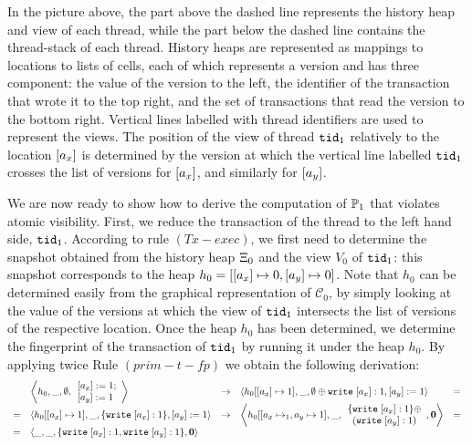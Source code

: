 \documentclass[a4paper,UKenglish]{article}%
\theoremstyle{plain}
\begin{document}
In the picture above, the part above the dashed line represents the history heap and 
view of each thread, while the part below the dashed line contains the thread-stack 
of each thread. History heaps are represented as mappings to locations to lists of cells, 
each of which represents a version and has three component: the value of the version 
to the left, the identifier of the transaction that wrote it to the top right, and the 
set of transactions that read the version to the bottom right. Vertical lines labelled 
with thread identifiers are used to represent the views. The position of the view of 
thread $\mathtt{tid}_1$ relatively to the location $[a_x]$ is determined by the version 
at which the vertical line labelled $\mathtt{tid}_1$ crosses the list of versions for $[a_x]$,
 and similarly for $[a_y]$.

We are now ready to show how to derive the computation of $\mathbb{P}_1$ that 
violates atomic visibility. First, we reduce the transaction of the thread 
to the left hand side, $\mathtt{tid}_1$. According to rule $(Tx-exec)$, we first need 
to determine the snapshot obtained from the history heap $\Xi_{0}$ and the 
view $V_0$ of $\mathtt{tid}_1$: this snapshot corresponds to the heap $h_0 = [ [a_x] \mapsto 0, 
[a_y] \mapsto 0]$. Note that $h_0$ can be determined easily from the graphical 
representation of $\mathcal{C}_0$, by simply looking at the value of the versions at 
which the view of $\mathtt{tid}_1$ intersects the list of versions of the respective location.
Once the heap $h_0$ has been determined, we determine the fingerprint of the 
transaction of $\mathtt{tid}_1$ by running it under the heap $h_0$. By applying twice Rule 
$(prim-t-fp)$ we obtain the following derivation: 
\begin{equation}
\label{eq:tx1}
\begin{array}{llcll}
&\left\langle h_0, \_, \emptyset, \begin{array}{l}
\pmutate{\loc_x}{1};\\ \pmutate{\loc_y}{1} \end{array} \right\rangle 
&\rightarrow& \left \langle h_0[ [\loc_x] \mapsto 1], \_, \emptyset \oplus \WR\; [\loc_x]: 1, 
\pmutate{\loc_y}{1} \right\rangle &= \\
=&\left \langle h_0[[\loc_x] \mapsto 1], \_, \{\WR\; [\loc_x]: 1\}, 
\pmutate{\loc_y}{1} \right\rangle 
&\rightarrow& 
\left\langle h_0[[\loc_x \mapsto_1, \loc_y \mapsto 1], \_, \begin{array}{c} \{\WR\;[\loc_x]:1\} \oplus\\  (\WR\;[\loc_y]: 1) \end{array}, 
\nil \right\rangle & = \\
=&\left \langle \_, \_, \{\WR\;[\loc_x]: 1, \WR\;[\loc_y]:1 \}, \nil \right\rangle
\end{array}
\end{equation}
\end{document}
